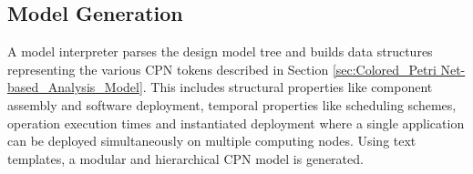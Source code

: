 \vspace{-0.1in}  

\subsection{Model Generation}

A model interpreter parses the design model tree and builds data structures representing the various CPN tokens described in Section \ref{sec:Colored_Petri Net-based_Analysis_Model}. This includes structural properties like component assembly and software deployment, temporal properties like scheduling schemes, operation execution times and instantiated deployment where a single application can be deployed simultaneously on multiple computing nodes. %
Using text templates, a modular and hierarchical CPN model is generated.

